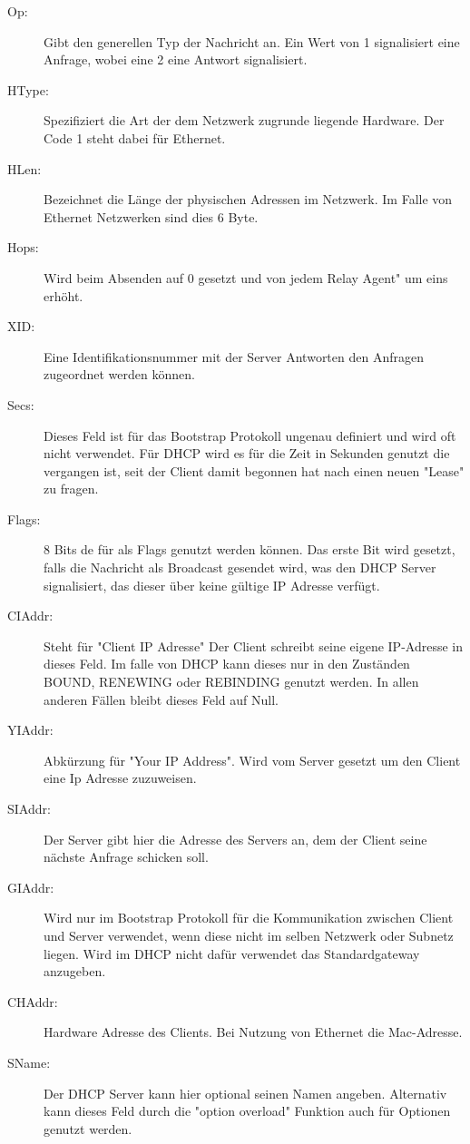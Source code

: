 \begin{description}

\item[Op: ] Gibt den generellen Typ der Nachricht an. Ein Wert von 1 signalisiert eine Anfrage, wobei eine 2 eine Antwort signalisiert.

\item[HType: ] Spezifiziert die Art der dem Netzwerk zugrunde liegende Hardware. Der Code 1 steht dabei für Ethernet. 
\item[HLen: ] Bezeichnet die Länge der physischen Adressen im Netzwerk. Im Falle von Ethernet Netzwerken sind dies 6 Byte. 
\item[Hops: ] Wird beim Absenden auf 0 gesetzt und von jedem Relay Agent" um eins erhöht. 
\item[XID: ] Eine Identifikationsnummer mit der Server Antworten den Anfragen zugeordnet werden können.
\item[Secs: ] Dieses Feld ist für das Bootstrap Protokoll ungenau definiert und wird oft nicht verwendet. Für DHCP wird es für die Zeit in Sekunden genutzt die vergangen ist, seit der Client damit begonnen hat nach einen neuen "Lease" zu fragen. 
\item[Flags: ] 8 Bits de für als Flags genutzt werden können. Das erste Bit wird gesetzt, falls die Nachricht als Broadcast gesendet wird, was den DHCP Server signalisiert, das dieser über keine gültige IP Adresse verfügt.
\item[CIAddr: ] Steht für "Client IP Adresse" Der Client schreibt seine eigene IP-Adresse in dieses Feld. Im falle von DHCP kann dieses nur in den Zuständen BOUND, RENEWING oder REBINDING genutzt werden. In allen anderen Fällen bleibt dieses Feld auf Null.
\item[YIAddr: ] Abkürzung für "Your IP Address". Wird vom Server gesetzt um den Client eine Ip Adresse zuzuweisen. 
\item[SIAddr: ] Der Server gibt hier die Adresse des Servers an, dem der Client seine nächste Anfrage schicken soll. 
\item[GIAddr: ] Wird nur im Bootstrap Protokoll für die Kommunikation zwischen Client und Server verwendet, wenn diese nicht im selben Netzwerk oder Subnetz liegen. Wird im DHCP nicht dafür verwendet das Standardgateway anzugeben. 
\item[CHAddr: ] Hardware Adresse des Clients. Bei Nutzung von Ethernet die Mac-Adresse. 
\item[SName: ] Der DHCP Server kann hier optional seinen Namen angeben. Alternativ kann dieses Feld durch die "option overload" Funktion auch für Optionen genutzt werden.

\end{description}
